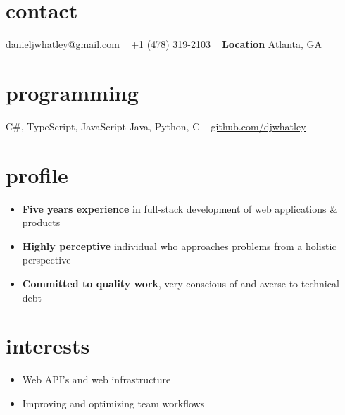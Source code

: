 \documentclass[print]{friggeri-cv} %
\begin{document}


\begin{aside} %
\section{contact}
\href{mailto:danieljwhatley@gmail.com}{danieljwhatley@gmail.com}
~
+1 (478) 319-2103
~
\textbf{Location}
Atlanta, GA
\section{programming}
C\#, TypeScript, JavaScript
Java, Python, C
~
{\FA \faGithub} \href{https://www.github.com/djwhatley}{github.com/djwhatley}
\end{aside}


\section{profile}

\begin{itemize}
	\item \textbf{Five years experience} in full-stack development of web applications \& products
	\item \textbf{Highly perceptive} individual who approaches problems from a holistic perspective
	\item \textbf{Committed to quality work}, very conscious of and averse to technical debt
\end{itemize}



\section{interests}

\begin{itemize}
\item Web API's and web infrastructure 
\item Improving and optimizing team workflows
\end{itemize}
\end{document}
